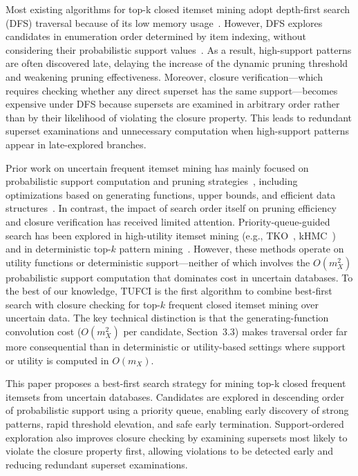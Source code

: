 \documentclass[10pt,letterpaper]{article}
\begin{document}
Most existing algorithms for top-k closed itemset mining adopt depth-first
search (DFS) traversal because of its low memory usage~\cite{bib11,bib13}.
However, DFS explores candidates in enumeration order determined by item
indexing, without considering their probabilistic support
values~\cite{bib8,bib13}. As a
result, high-support patterns are often discovered late, delaying the increase
of the dynamic pruning threshold and weakening pruning effectiveness. Moreover,
closure verification---which requires checking whether any direct superset has
the same support---becomes expensive under DFS because supersets are examined
in arbitrary order rather than by their likelihood of violating the closure
property. This leads to redundant superset examinations and unnecessary
computation when high-support patterns appear in late-explored branches.

Prior work on uncertain frequent itemset mining has mainly focused on
probabilistic support computation and pruning
strategies~\cite{bib4,bib9}, including optimizations based on generating
functions, upper bounds, and efficient data
structures~\cite{bib3,bib10,bib14}. In contrast, the impact of search order itself
on pruning efficiency and closure verification has received limited attention.
Priority-queue-guided search has been explored in high-utility itemset mining
(e.g., TKO~\cite{bib17}, kHMC~\cite{bib18}) and in deterministic top-$k$
pattern mining~\cite{bib6}. However, these methods operate on utility functions
or deterministic support---neither of which involves the $O(m_X^2)$
probabilistic support computation that dominates cost in uncertain databases.
To the best of our knowledge, TUFCI is the first algorithm to combine
best-first search with closure checking for top-$k$ frequent closed itemset
mining over uncertain data. The key technical distinction is that the
generating-function convolution cost ($O(m_X^2)$ per candidate, Section~3.3)
makes traversal order far more consequential than in deterministic or
utility-based settings where support or utility is computed in $O(m_X)$.

This paper proposes a best-first search strategy for mining top-k closed
frequent itemsets from uncertain databases. Candidates are explored in
descending order of probabilistic support using a priority queue, enabling
early discovery of strong patterns, rapid threshold elevation, and safe early
termination. Support-ordered exploration also improves closure checking by
examining supersets most likely to violate the closure property first, allowing
violations to be detected early and reducing redundant superset examinations.
\end{document}
